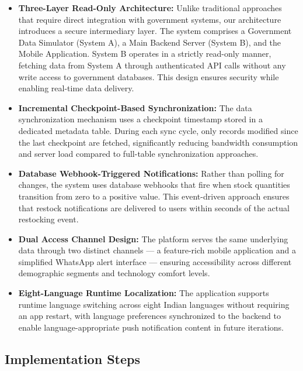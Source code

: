 \begin{itemize}
    \item \textbf{Three-Layer Read-Only Architecture:} Unlike traditional approaches that require direct integration with government systems, our architecture introduces a secure intermediary layer. The system comprises a Government Data Simulator (System A), a Main Backend Server (System B), and the Mobile Application. System B operates in a strictly read-only manner, fetching data from System A through authenticated API calls without any write access to government databases. This design ensures security while enabling real-time data delivery.

    \item \textbf{Incremental Checkpoint-Based Synchronization:} The data synchronization mechanism uses a checkpoint timestamp stored in a dedicated metadata table. During each sync cycle, only records modified since the last checkpoint are fetched, significantly reducing bandwidth consumption and server load compared to full-table synchronization approaches.

    \item \textbf{Database Webhook-Triggered Notifications:} Rather than polling for changes, the system uses database webhooks that fire when stock quantities transition from zero to a positive value. This event-driven approach ensures that restock notifications are delivered to users within seconds of the actual restocking event.

    \item \textbf{Dual Access Channel Design:} The platform serves the same underlying data through two distinct channels --- a feature-rich mobile application and a simplified WhatsApp alert interface --- ensuring accessibility across different demographic segments and technology comfort levels.

    \item \textbf{Eight-Language Runtime Localization:} The application supports runtime language switching across eight Indian languages without requiring an app restart, with language preferences synchronized to the backend to enable language-appropriate push notification content in future iterations.
\end{itemize}

\subsection{Implementation Steps}

